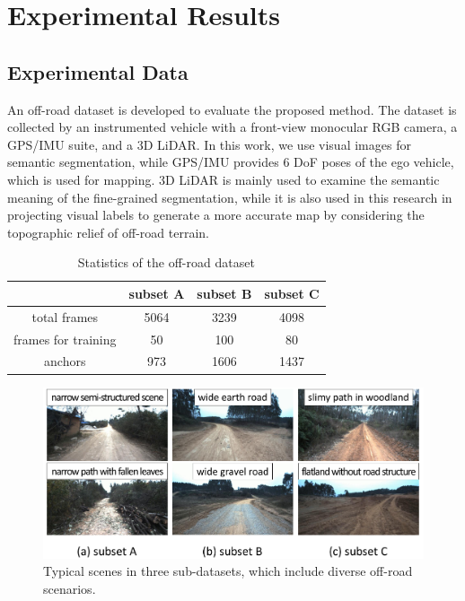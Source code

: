 \documentclass[letterpaper, 10 pt, conference]{ieeeconf}  %
\begin{document}
	\section{Experimental Results}	\label{exp}
	\subsection{Experimental Data}
	An off-road dataset is developed to evaluate the proposed method.
	The dataset is collected by an instrumented vehicle with a front-view monocular RGB camera,
	a GPS/IMU suite, and a 3D LiDAR. In this work, we use visual images for semantic segmentation, 
	while GPS/IMU provides 6 DoF poses of the ego vehicle, which is used for mapping. 
	3D LiDAR is mainly used to examine the semantic meaning of the fine-grained segmentation, 
	while it is also used in this research in projecting visual labels to generate a more accurate map by considering the topographic relief of off-road terrain.
	
	\begin{table}[]
		\centering
		\caption{Statistics of the off-road dataset}
		\label{tab:dataset}
		\begin{tabular}{cccc} 
			\hline
			& subset A & subset B & subset C  \\ 
			\hline
			total frames        & 5064     & 3239     & 4098      \\
			frames for training & 50       & 100      & 80        \\
			anchors       & 973      & 1606     & 1437      \\
			\hline
		\end{tabular}
	\end{table}
	
	\begin{figure}[]
		\centering
		\includegraphics[scale=0.28]{dataset.pdf}
		\caption{Typical scenes in three sub-datasets, which include diverse off-road scenarios.}
		\label{fig:dataset}
	\end{figure}
	
\end{document}
